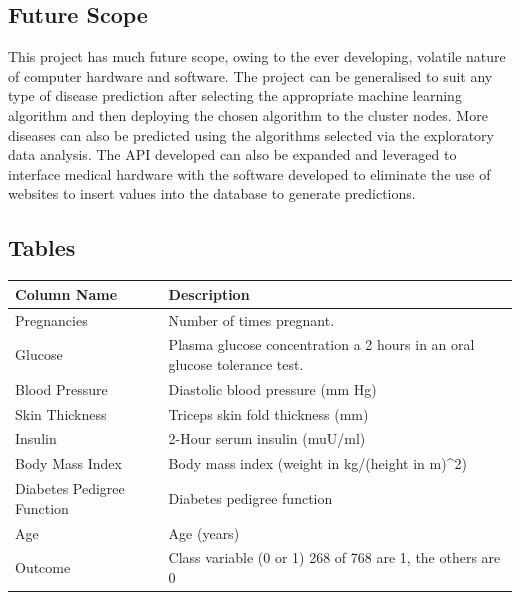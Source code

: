 \documentclass[12pt]{article}
\begin{document}
\subsection{Future Scope}
This project has much future scope, owing to the ever developing, volatile nature of computer hardware and software. The project can be generalised to suit any type of disease prediction after selecting the appropriate machine learning algorithm and then deploying the chosen algorithm to the cluster nodes. More diseases can also be predicted using the algorithms selected via the exploratory data analysis. The API developed can also be expanded and leveraged to interface medical hardware with the software developed to eliminate the use of websites to insert values into the database to generate predictions.






\newpage
{
\clearpage
\begin{landscape}
\centering
\begin{table}[]
\centering
\vspace{5cm}
\section{Tables}
\begin{tabular}{|l|l|}
\hline
Column Name                & Description                                                               \\ \hline
Pregnancies                & Number of times pregnant.                                                 \\ \hline
Glucose                    & Plasma glucose concentration a 2 hours in an oral glucose tolerance test. \\ \hline
Blood Pressure             & Diastolic blood pressure (mm Hg)                                          \\ \hline
Skin Thickness             & Triceps skin fold thickness (mm)                                          \\ \hline
Insulin                    & 2-Hour serum insulin (muU/ml)                                             \\ \hline
Body Mass Index            & Body mass index (weight in kg/(height in m)\textasciicircum{}2)           \\ \hline
Diabetes Pedigree Function & Diabetes pedigree function                                                \\ \hline
Age                        & Age (years)                                                               \\ \hline
Outcome                    & Class variable (0 or 1) 268 of 768 are 1, the others are 0                \\ \hline
\end{tabular}
\end{table}
\label{table:1}
\end{landscape}
\clearpage
}
\end{document}
